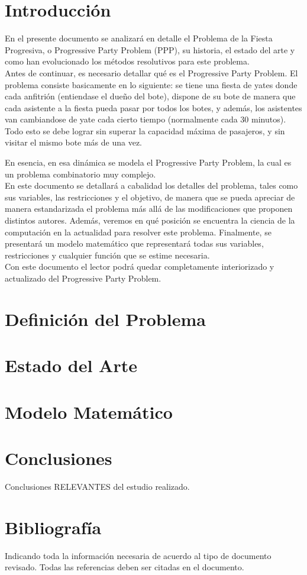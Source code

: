 \documentclass[letter, 10pt]{article}
\begin{document}
\section{Introducción}
En el presente documento se analizará en detalle el Problema de la Fiesta Progresiva, o Progressive Party Problem (PPP), su historia, el estado del arte y como han evolucionado los métodos resolutivos para este problema.\\

Antes de continuar, es necesario detallar qué es el Progressive Party Problem. El problema consiste basicamente en lo siguiente: se tiene una fiesta de yates donde cada anfitrión (entiendase el dueño del bote), dispone de su bote de manera que cada asistente a la fiesta pueda pasar por todos los botes, y además, los asistentes van cambiandose de yate cada cierto tiempo (normalmente cada 30 minutos). Todo esto se debe lograr sin superar la capacidad máxima de pasajeros, y sin visitar el mismo bote más de una vez.

En esencia, en esa dinámica se modela el Progressive Party Problem, la cual es un problema combinatorio muy complejo.\\

En este documento se detallará a cabalidad los detalles del problema, tales como sus variables, las restricciones y el objetivo, de manera que se pueda apreciar de manera estandarizada el problema más allá de las modificaciones que proponen distintos autores. Además, veremos en qué posición se encuentra la ciencia de la computación en la actualidad para resolver este problema. Finalmente, se presentará un modelo matemático que representará todas sus variables, restricciones y cualquier función que se estime necesaria.\\

Con este documento el lector podrá quedar completamente interiorizado y actualizado del Progressive Party Problem.

\section{Definición del Problema}
\cite{FirstPublication}

\section{Estado del Arte}


\section{Modelo Matemático}

\section{Conclusiones}
Conclusiones RELEVANTES del estudio realizado.

\section{Bibliograf\'ia}
Indicando toda la informaci\'on necesaria de acuerdo al tipo de documento revisado. Todas las referencias deben ser 
citadas en el documento.


\end{document}
